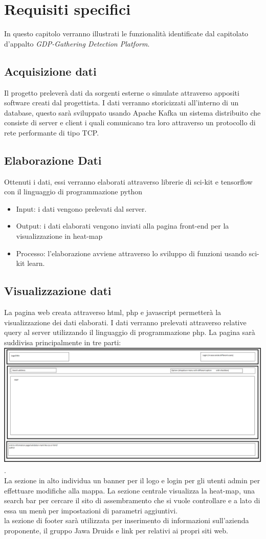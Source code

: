 \chapter{Requisiti specifici}
In questo capitolo verranno illustrati le funzionalità identificate dal capitolato d'appalto \textit{GDP-Gathering Detection Platform}. 
\section{Acquisizione dati}
Il progetto preleverà dati da sorgenti esterne o simulate attraverso appositi software creati dal progettista. I dati verranno storicizzati all'interno di un database, questo sarà sviluppato usando Apache Kafka un sistema distribuito che consiste di server e client i quali comunicano tra loro attraverso un protocollo di rete performante di tipo TCP.

\section{Elaborazione Dati}
Ottenuti i dati, essi verranno elaborati attraverso librerie di sci-kit e tensorflow con il linguaggio di programmazione python
\begin{itemize}
	\item Input: i dati vengono prelevati dal server.
	\item Output: i dati elaborati vengono inviati alla pagina front-end per la visualizzazione in heat-map
	\item Processo: l'elaborazione avviene attraverso lo sviluppo di funzioni usando sci-kit learn.
\end{itemize}
\section{Visualizzazione dati}
La pagina web creata attraverso html, php e javascript permetterà la visualizzazione dei dati elaborati. I dati verranno prelevati attraverso relative query al server utilizzando il linguaggio di programmazione php.
La pagina sarà suddivisa principalmente in tre parti: \includegraphics{../immagini/templateHtmlGDP.png}.\\
La sezione in alto individua un banner per il logo e login per gli utenti admin per effettuare modifiche alla mappa.
La sezione centrale visualizza la heat-map, una search bar per cercare il sito di assembramento che si vuole controllare e a lato di essa un menù per impostazioni di parametri aggiuntivi.\\
la sezione di footer sarà utilizzata per inserimento di informazioni sull'azienda proponente, il gruppo Jawa Druids e link per relativi ai propri siti web.